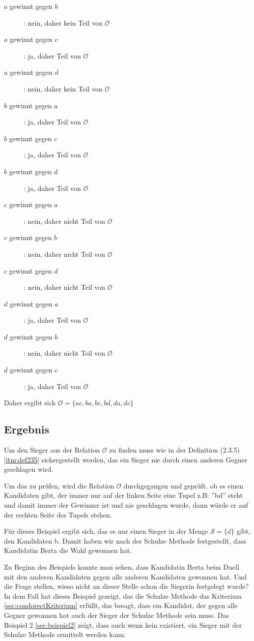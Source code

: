 \begin{description}
\item[$a$ gewinnt gegen $b$]: nein, daher kein Teil von $\mathcal{O}$ 
\item[$a$ gewinnt gegen $c$]: ja, daher Teil von $\mathcal{O}$ 
\item[$a$ gewinnt gegen $d$]: nein, daher kein Teil von $\mathcal{O}$ 
\item[$b$ gewinnt gegen $a$]: ja, daher Teil von $\mathcal{O}$ 
\item[$b$ gewinnt gegen $c$]: ja, daher Teil von $\mathcal{O}$ 
\item[$b$ gewinnt gegen $d$]: ja, daher Teil von $\mathcal{O}$ 
\item[$c$ gewinnt gegen $a$]: nein, daher nicht Teil von $\mathcal{O}$ 
\item[$c$ gewinnt gegen $b$]: nein, daher nicht Teil von $\mathcal{O}$ 
\item[$c$ gewinnt gegen $d$]: nein, daher nicht Teil von $\mathcal{O}$ 
\item[$d$ gewinnt gegen $a$]: ja, daher Teil von $\mathcal{O}$ 
\item[$d$ gewinnt gegen $b$]: nein, daher nicht Teil von $\mathcal{O}$ 
\item[$d$ gewinnt gegen $c$]: ja, daher Teil von $\mathcal{O}$ 
\end{description} 

Daher ergibt sich $\mathcal{O} = \{ ac,ba,bc,bd,da,dc \}$

\subsection{Ergebnis} 
\label{sec:ergebnis1}
Um den Sieger aus der Relation $\mathcal{O}$ zu finden muss wie in der Definition (2.3.5) \ref{itm:def235} sichergestellt werden, das ein Sieger nie durch einen anderen Gegner geschlagen wird.

Um das zu prüfen, wird die Relation $\mathcal{O}$ durchgegangen und geprüft, ob es einen Kandidaten gibt, der immer nur auf der linken Seite eine Tupel z.B: ''bd'' steht und damit immer der Gewinner ist und nie geschlagen wurde, dann würde er auf der rechten Seite des Tupels stehen.

Für dieses Beispiel ergibt sich, das es nur einen Sieger in der Menge $\mathcal{S}=\{d\}$ gibt, den Kandidaten b. Damit haben wir nach der Schulze Methode festgestellt, dass Kandidatin Berta die Wahl gewonnen hat.

Zu Beginn des Beispiels konnte man sehen, dass Kandidatin Berta beim Duell mit den anderen Kandidaten gegen alle anderen Kandidaten gewonnen hat. Und die Frage stellen, wieso nicht an dieser Stelle schon die Siegerin festgelegt wurde? In dem Fall hat dieses Beispiel gezeigt, das die Schulze Methode das \condorcet Kriterium \ref{sec:condorectKriterium} erfüllt, das besagt, dass ein Kandidat, der gegen alle Gegner gewonnen hat auch der Sieger der Schulze Methode sein muss. Das Beispiel 2 \ref{sec:beispiel2} zeigt, dass auch wenn kein \condorcetSieger existiert, ein Sieger mit der Schulze Methode ermittelt werden kann.



